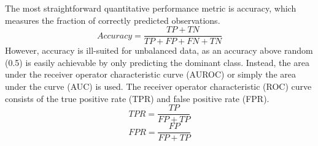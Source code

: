 The most straightforward quantitative performance metric is accuracy, which measures the fraction of correctly predicted observations.
\begin{equation}
    Accuracy = \frac{TP+TN}{TP+FP+FN+TN}
\end{equation}
However, accuracy is ill-suited for unbalanced data, as an accuracy above random (0.5) is easily achievable by only predicting the dominant class. Instead, the area under the receiver operator characteristic curve (AUROC) or simply the area under the curve (AUC) is used. The receiver operator characteristic (ROC) curve consists of the true positive rate (TPR) and false positive rate (FPR).
\begin{equation}
    TPR = \frac{TP}{FP+TP}
\end{equation}
\begin{equation}
    FPR = \frac{FP}{FP+TP}
\end{equation}

